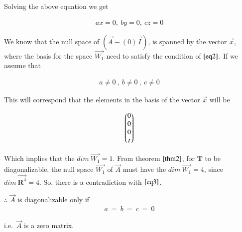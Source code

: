 \documentclass[journal,12pt,twocolumn]{IEEEtran}
\begin{document}
	Solving the above equation we get
	
	\begin{align}\label{eq2}
	    ax = 0,\ by = 0,\ cz = 0 
	\end{align}
	
	We know that the null space of $\left( \Vec{A} - (0)\Vec{I}\right)$, is spanned by the vector $\vec{x}$, where the basis for the space $\Vec{W_1}$ need to satisfy the condition of $\eqref{eq2}$. If we assume that 
	
	\begin{align}\label{eq3}
		a \neq 0 \ , \ b \neq 0 \ , \ c \neq 0
	\end{align} 
	
	This will correspond that the elements in the basis of the vector $\vec{x}$ will be 
	
	\begin{align}
		\begin{pmatrix}0\\0\\0\\t\end{pmatrix}
	\end{align}
	
	Which implies that the $dim\ \Vec{W_1} = 1$. From theorem $\ref{thm2}$, for $\mathbf{T}$ to be diagonalizable, the null space $\Vec{W_1}$ of $\vec{A}$ must have the $dim\ \Vec{W_1} = 4$, since $dim\ \Vec{\mathbf{R}^4} = 4$. So, there is a contradiction with $\eqref{eq3}$.
	
	$\therefore$ $\Vec{A}$ is diagonalizable only if
	\begin{align}
		a \ = \ b  \ = \ c \ = \ 0
	\end{align}
	
	i.e.\ $\Vec{A}$ is a zero matrix.
		
\end{document}
